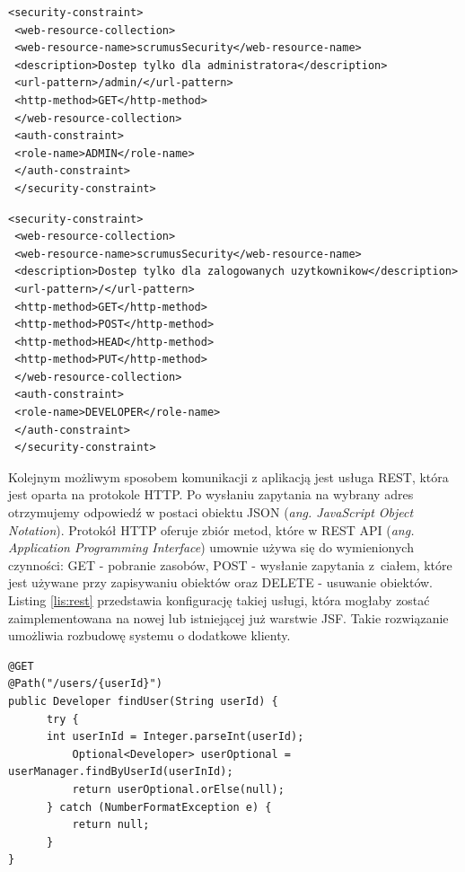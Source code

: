 \begin{lstlisting}[caption={Konfiguracja zabezpieczeń systemu scrumus - administrator}, label=lis:konf_zab_ad, numbers=none]
 <security-constraint>
 <web-resource-collection>
 <web-resource-name>scrumusSecurity</web-resource-name>
 <description>Dostep tylko dla administratora</description>
 <url-pattern>/admin/</url-pattern>
 <http-method>GET</http-method>
 </web-resource-collection>
 <auth-constraint>
 <role-name>ADMIN</role-name>
 </auth-constraint>
 </security-constraint>
 \end{lstlisting}
 \newpage
 \begin{lstlisting}[caption={Konfiguracja zabezpieczeń systemu scrumus - zalogowany użytkownik}, label=lis:konf_zab_zal, numbers=none]
 <security-constraint>
 <web-resource-collection>
 <web-resource-name>scrumusSecurity</web-resource-name>
 <description>Dostep tylko dla zalogowanych uzytkownikow</description>
 <url-pattern>/</url-pattern>
 <http-method>GET</http-method>
 <http-method>POST</http-method>
 <http-method>HEAD</http-method>
 <http-method>PUT</http-method>
 </web-resource-collection>
 <auth-constraint>
 <role-name>DEVELOPER</role-name>
 </auth-constraint>
 </security-constraint>\end{lstlisting}
 
 
 Kolejnym możliwym sposobem komunikacji z aplikacją jest usługa REST, która jest oparta na protokole HTTP. Po wysłaniu zapytania na wybrany adres otrzymujemy odpowiedź w postaci obiektu JSON (\textit{ang. JavaScript Object Notation}). Protokół HTTP oferuje zbiór metod, które w REST API (\textit{ang. Application Programming Interface}) umownie używa się do wymienionych czynności: GET - pobranie zasobów, POST - wysłanie zapytania z~ciałem, które jest używane przy zapisywaniu obiektów oraz DELETE - usuwanie obiektów. Listing \ref{lis:rest} przedstawia konfigurację takiej usługi, która mogłaby zostać zaimplementowana na nowej lub istniejącej już warstwie JSF. Takie rozwiązanie umożliwia rozbudowę systemu o dodatkowe klienty.

\begin{lstlisting}[caption={Przykładowa usługa REST}, label=lis:rest, numbers=none]
@GET
@Path("/users/{userId}")
public Developer findUser(String userId) {
	  try {
	  int userInId = Integer.parseInt(userId);
		  Optional<Developer> userOptional = userManager.findByUserId(userInId);
		  return userOptional.orElse(null);
	  } catch (NumberFormatException e) {
		  return null;
	  }
}
\end{lstlisting}


